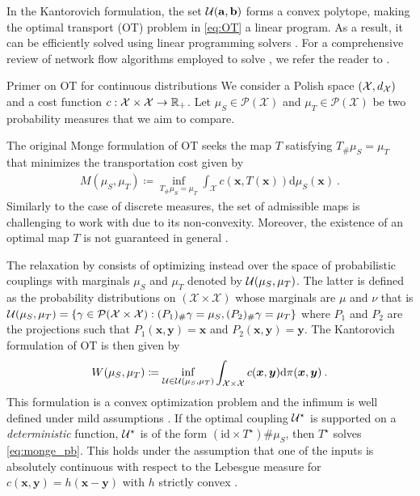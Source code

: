 In the Kantorovich formulation, the set ${\mathcal{U}}({\mathbf{a}}, {\mathbf{b}})$ forms a convex polytope, making the optimal transport (OT) problem in \eqref{eq:OT} a linear program. As a result, it can be efficiently solved using linear programming solvers \citep{dantzig2016linear}. For a comprehensive review of network flow algorithms employed to solve , we refer the reader to \citep{peyre2019computational}.

\begin{mem1}{Primer on OT for continuous distributions}
    We consider a Polish space $(\mathcal{X}, d_{{\mathcal{X}}})$ and a cost function $c : \mathcal{X} \times \mathcal{X} \to \mathbb{R}_+$. Let $\mu_S \in \mathcal{P}(\mathcal{X})$ and $\mu_T \in \mathcal{P}(\mathcal{X})$ be two probability measures that we aim to compare.

    The original Monge formulation \citep{monge1781memoire} of OT seeks the map $T$ satisfying $T_{\#}\mu_S = \mu_T$ that minimizes the transportation cost given by
    \begin{align}\label{eq:monge_pb_continuous}
        M(\mu_S, \mu_T) \coloneqq \inf_{T_{\#}\mu_S = \mu_T} \int_{\mathcal{X}} c(\bm{x}, T(\bm{x})) \mathrm{d}\mu_S(\bm{x}) \:.
    \end{align}
    Similarly to the case of discrete measures, the set of admissible maps is challenging to work with due to its non-convexity. Moreover, the existence of an optimal map \(T\) is not guaranteed in general \citep{santambrogio2015optimal}.

    The relaxation by \cite{kantorovich1942translocation} consists of optimizing instead over the space of probabilistic couplings with marginals $\mu_S$ and $\mu_T$ denoted by ${\mathcal{U}}(\mu_S, \mu_T)$. The latter is defined as the probability distributions on $(\mathcal{X} \times \mathcal{X})$ whose marginals are $\mu$ and $\nu$ that is ${\mathcal{U}}(\mu_S, \mu_T) = \left\{ \gamma \in \mathcal{P}(\mathcal{X} \times \mathcal{X}) : (P_{1})_\# \gamma = \mu_S, (P_{2})_\# \gamma = \mu_T \right\}$ where $P_{1}$ and $P_{2}$ are the projections such that $P_{1}(\bm{x}, \bm{y}) = \bm{x}$ and $P_{2}(\bm{x}, \bm{y}) = \bm{y}$.
    The Kantorovich formulation of OT is then given by
    \begin{align}\label{eq:Wasserstein}
        W(\mu_S, \mu_T) \coloneqq \inf_{{\mathcal{U}} \in {\mathcal{U}}(\mu_S, \mu_T)} \int_{\mathcal{X} \times \mathcal{X}} c(\bm{x}, \bm{y}) \mathrm{d}\pi(\bm{x}, \bm{y}) \:.
    \end{align}
    This formulation is a convex optimization problem and the infimum is well
    defined under mild assumptions \citep{santambrogio2015optimal}. If the optimal
    coupling ${\mathcal{U}}^\star$ is supported on a \emph{deterministic} function, \ie
    ${\mathcal{U}}^\star$ is of the form $(\mathrm{id} \times T^\star)\# \mu_S$, then
    $T^\star$ solves \eqref{eq:monge_pb}. This holds under the assumption that one
    of the inputs is absolutely continuous with respect to the Lebesgue measure
    for $c(\bm{x}, \bm{y}) = h(\bm{x} - \bm{y})$ with
    $h$ strictly convex \citep{gangbo1996geometry}.
    
    \end{mem1}

